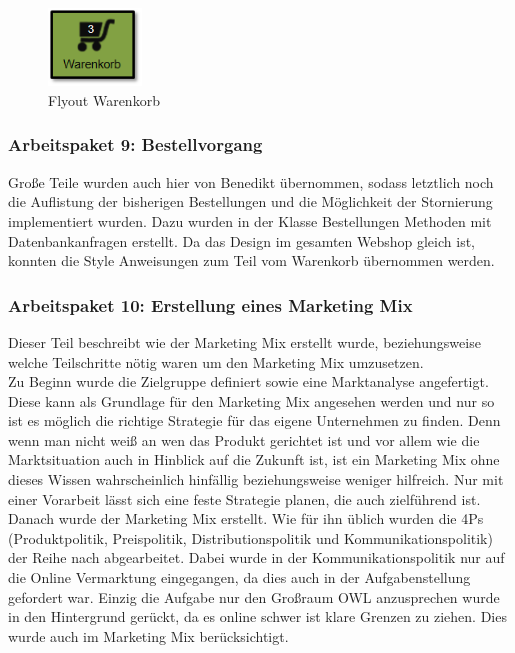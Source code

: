 \begin{figure}[H]
	\begin{center}
			\includegraphics[width=25mm]{Bilder/Warenkorb_symbol.png}
	\end{center}
	\caption{Flyout Warenkorb}
\end{figure}

\subsubsection{Arbeitspaket 9: Bestellvorgang}
Große Teile wurden auch hier von Benedikt übernommen, sodass letztlich noch die Auflistung der bisherigen Bestellungen und die Möglichkeit der Stornierung implementiert wurden. Dazu wurden in der Klasse Bestellungen Methoden mit Datenbankanfragen erstellt. Da das Design im gesamten Webshop gleich ist, konnten die Style Anweisungen zum Teil vom Warenkorb übernommen werden.

\subsubsection{Arbeitspaket 10: Erstellung eines Marketing Mix}
Dieser Teil beschreibt wie der Marketing Mix erstellt wurde, beziehungsweise welche Teilschritte nötig waren um den Marketing Mix umzusetzen.\\
Zu Beginn wurde die Zielgruppe definiert sowie eine Marktanalyse angefertigt. Diese kann als Grundlage für den Marketing Mix angesehen werden und nur so ist es möglich die richtige Strategie für das eigene Unternehmen zu finden. Denn wenn man nicht weiß an wen das Produkt gerichtet ist und vor allem wie die Marktsituation auch in Hinblick auf die Zukunft ist, ist ein Marketing Mix ohne dieses Wissen wahrscheinlich hinfällig beziehungsweise weniger hilfreich. Nur mit einer Vorarbeit lässt sich eine feste Strategie planen, die auch zielführend ist.\\
Danach wurde der Marketing Mix erstellt. Wie für ihn üblich wurden die 4Ps (Produktpolitik, Preispolitik, Distributionspolitik und Kommunikationspolitik) der Reihe nach abgearbeitet. Dabei wurde in der Kommunikationspolitik nur auf die Online Vermarktung eingegangen, da dies auch in der Aufgabenstellung gefordert war. Einzig die Aufgabe nur den Großraum OWL anzusprechen wurde in den Hintergrund gerückt, da es online schwer ist klare Grenzen zu ziehen. Dies wurde auch im Marketing Mix berücksichtigt. \\


